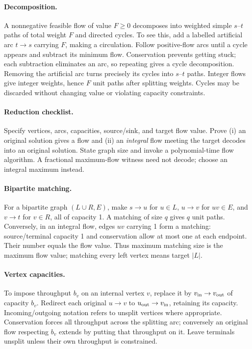 \paragraph{Decomposition.}
A nonnegative feasible flow of value $F\ge0$ decomposes into weighted simple
$s$--$t$ paths of total weight $F$ and directed cycles. To see this, add a
labelled artificial arc $t\to s$ carrying $F$, making a circulation.
Follow positive-flow arcs until a cycle appears and subtract its minimum
flow. Conservation prevents getting stuck; each subtraction eliminates an
arc, so repeating gives a cycle decomposition. Removing the artificial arc
turns precisely its cycles into $s$--$t$ paths. Integer flows give integer
weights, hence $F$ unit paths after splitting weights. Cycles may be discarded
without changing value or violating capacity constraints.

\paragraph{Reduction checklist.}
Specify vertices, arcs, capacities, source/sink, and target flow value.
Prove (i) an original solution gives a flow and (ii) an \emph{integral} flow
meeting the target decodes into an original solution. State graph size and
invoke a polynomial-time flow algorithm. A fractional maximum-flow witness
need not decode; choose an integral maximum instead.

\paragraph{Bipartite matching.}
For a bipartite graph $(L\cup R,E)$, make
$s\to u$ for $u\in L$, $u\to v$ for $uv\in E$, and $v\to t$ for $v\in R$,
all of capacity 1. A matching of size $q$ gives $q$ unit paths.
Conversely, in an integral flow, edges $uv$ carrying 1 form a matching:
source/terminal capacity 1 and conservation allow at most one at each
endpoint. Their number equals the flow value. Thus maximum matching size is
the maximum flow value; matching every left vertex means target $|L|$.

\paragraph{Vertex capacities.}
To impose throughput $b_v$ on an internal vertex $v$, replace it by
$v_{\rm in}\to v_{\rm out}$ of capacity $b_v$. Redirect each original
$u\to v$ to $u_{\rm out}\to v_{\rm in}$, retaining its capacity.
Incoming/outgoing notation refers to unsplit vertices where appropriate.
Conservation forces all throughput across the splitting arc; conversely an
original flow respecting $b_v$ extends by putting that throughput on it.
Leave terminals unsplit unless their own throughput is constrained.

